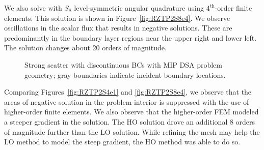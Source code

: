 \documentclass[12pt]{article}
\begin{document}
We also solve with $S_8$ level-symmetric angular quadrature using $4^\text{th}$-order finite elements. This solution is shown in Figure~\ref{fig:RZTP2S8e4}. We observe oscillations in the scalar flux that results in negative solutions. These are predominantly in the boundary layer regions near the upper right and lower left. The solution changes about 20 orders of magnitude.

\begin{figure}[!htb]
\centering
{}
\caption{Strong scatter with discontinuous BCs with MIP DSA problem geometry; gray boundaries indicate incident boundary locations.}
\label{fig:StrongScatterProblem}
\end{figure}

Comparing Figures~\ref{fig:RZTP2S4e1} and \ref{fig:RZTP2S8e4}, we observe that the areas of negative solution in the problem interior is suppressed with the use of higher-order finite elements. We also observe that the higher-order FEM modeled a steeper gradient in the solution. The HO solution drove an additional 8 orders of magnitude further than the LO solution. While refining the mesh may help the LO method to model the steep gradient, the HO method was able to do so.
\end{document}
